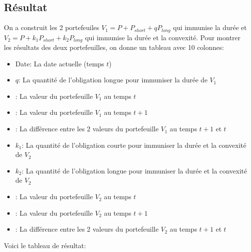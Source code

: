 \documentclass[letterpaper,11pt]{article}
\newcommand{\?}{\stackrel{?}{=}}
\begin{document}
\newpage
\subsection*{Résultat}
On a construit les 2 portefeuiles $V_1=P+P_{short}+qP_{long}$ qui immunise la durée et $V_2=P+k_1P_{short}+k_2P_{long}$ qui immunise la durée et la convexité. Pour montrer les résultats des deux portefeuilles, on donne un tableau avec 10 colonnes:
\begin{itemize}
    \item Date: La date actuelle (temps $t$)
    \item $q$: La quantité de l'obligation longue pour immuniser la durée de $V_1$
    \item {}: La valeur du portefeuille $V_1$ au temps $t$
    \item {}: La valeur du portefeuille $V_1$ au temps $t+1$
    \item {}: La différence entre les 2 valeurs du portefeuille $V_1$ au temps $t+1$ et $t$ 
    \item $k_1$: La quantité de l'obligation courte pour immuniser la durée et la convexité de $V_2$
    \item $k_2$: La quantité de l'obligation longue pour immuniser la durée et la convexité de $V_2$
    \item {}: La valeur du portefeuille $V_2$ au temps $t$
    \item {}: La valeur du portefeuille $V_2$ au temps $t+1$
    \item {}: La différence entre les 2 valeurs du portefeuille $V_2$ au temps $t+1$ et $t$ 
\end{itemize}

Voici le tableau de résultat:
\end{document}

